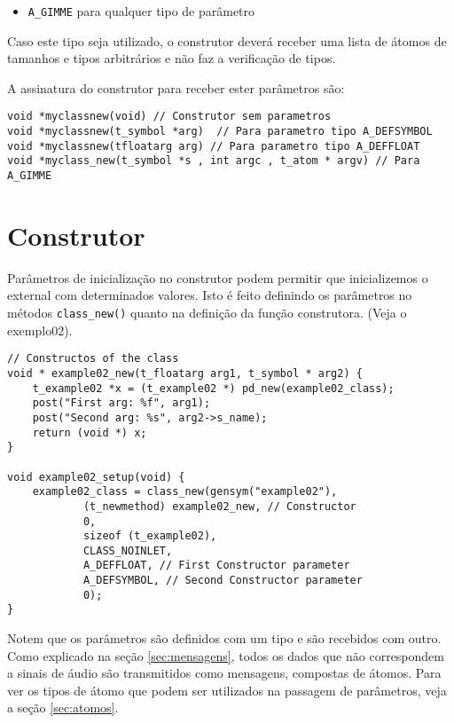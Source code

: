 \begin{itemize}
   \item \texttt{A\_GIMME} para qualquer tipo de parâmetro
\end{itemize}

Caso este tipo seja utilizado, o construtor deverá receber uma lista de átomos
de tamanhos e tipos arbitrários e não faz a verificação de tipos.

A assinatura do construtor para receber ester parâmetros são:

\begin{lstlisting}[caption=Assinatura do construtor]
void *myclassnew(void) // Construtor sem parametros
void *myclassnew(t_symbol *arg)  // Para parametro tipo A_DEFSYMBOL
void *myclassnew(tfloatarg arg) // Para parametro tipo A_DEFFLOAT
void *myclass_new(t_symbol *s , int argc , t_atom * argv) // Para A_GIMME
\end{lstlisting}

\section{Construtor}

Parâmetros de inicialização no construtor podem permitir que inicializemos o
external com determinados valores. Isto é feito definindo os parâmetros no
métodos \texttt{class\_new()} quanto na definição da função construtora. (Veja o
exemplo02).

\begin{lstlisting}[caption=Passagem de parâmetro para o construtor]
// Constructos of the class
void * example02_new(t_floatarg arg1, t_symbol * arg2) {
    t_example02 *x = (t_example02 *) pd_new(example02_class);
    post("First arg: %f", arg1);
    post("Second arg: %s", arg2->s_name);
    return (void *) x;
}

void example02_setup(void) {
    example02_class = class_new(gensym("example02"),
            (t_newmethod) example02_new, // Constructor
            0,
            sizeof (t_example02),
            CLASS_NOINLET,
            A_DEFFLOAT, // First Constructor parameter
            A_DEFSYMBOL, // Second Constructor parameter
            0);
}
\end{lstlisting}

Notem que os parâmetros são definidos com um tipo e são recebidos com outro.
Como explicado na seção \ref{sec:mensagens}, todos os dados que não
correspondem a sinais de áudio são transmitidos como mensagens, compostas de
átomos.
Para ver os tipos de átomo que podem ser utilizados na passagem de parâmetros,
veja a seção \ref{sec:atomos}.

